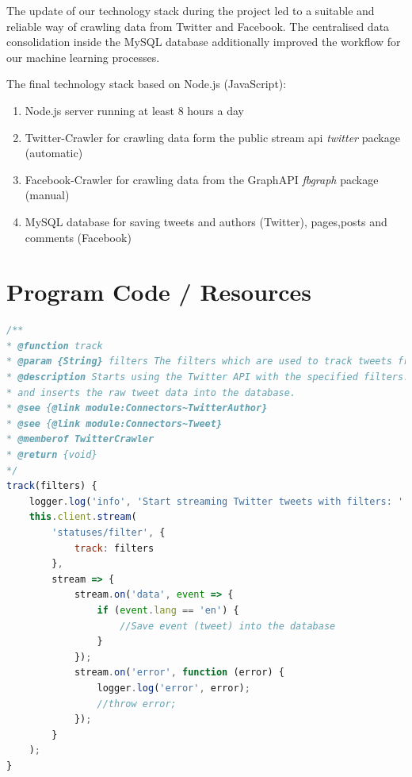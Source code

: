 \documentclass[11pt,titlepage,oneside,openany]{book}
\begin{document}
The update of our technology stack during the project led to a suitable and reliable way of crawling data from Twitter and Facebook. The centralised data consolidation inside the MySQL database additionally improved the workflow for our machine learning processes.

The final technology stack based on Node.js (JavaScript):

\begin{enumerate}
	\item Node.js server running at least 8 hours a day
	\item Twitter-Crawler for crawling data form the public stream \acrshort{api} \textit{twitter} package~\cite{Morris2017-01-13} (automatic)
	\item Facebook-Crawler for crawling data from the GraphAPI \textit{fbgraph} package~\cite{Oliveira2017-01-19} (manual)
	\item MySQL database for saving tweets and authors (Twitter), pages,posts and comments (Facebook)
\end{enumerate}



\printbibliography


\appendix
\chapter{Program Code / Resources}
\label{cha:appendix-a}


\begin{lstlisting}[caption={TwitterCrawler.track},captionpos=b,language=JavaScript,label={lst:twitterCrawler}]
/**
* @function track 
* @param {String} filters The filters which are used to track tweets from the Twitter API
* @description Starts using the Twitter API with the specified filters. When a new tweet is crawled it upserts the author data
* and inserts the raw tweet data into the database.
* @see {@link module:Connectors~TwitterAuthor}
* @see {@link module:Connectors~Tweet}
* @memberof TwitterCrawler
* @return {void}
*/
track(filters) {
    logger.log('info', 'Start streaming Twitter tweets with filters: ' + filters);
    this.client.stream(
        'statuses/filter', {
            track: filters
        },
        stream => {
            stream.on('data', event => {
                if (event.lang == 'en') {
                	//Save event (tweet) into the database
                }
            });
            stream.on('error', function (error) {
                logger.log('error', error);
                //throw error;
            });
        }
    );
}
\end{lstlisting}
\end{document}
